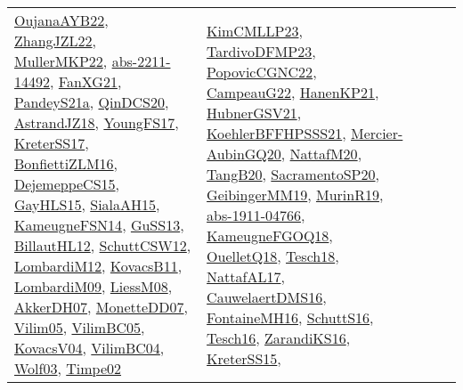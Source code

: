 {\begin{longtable}{llp{6cm}p{6cm}p{6cm}}
\href{papers/OujanaAYB22.pdf}{OujanaAYB22}\cite{OujanaAYB22}, \href{papers/ZhangJZL22.pdf}{ZhangJZL22}\cite{ZhangJZL22}, \href{articles/MullerMKP22.pdf}{MullerMKP22}\cite{MullerMKP22}, \href{articles/abs-2211-14492.pdf}{abs-2211-14492}\cite{abs-2211-14492}, \href{articles/FanXG21.pdf}{FanXG21}\cite{FanXG21}, \href{articles/PandeyS21a.pdf}{PandeyS21a}\cite{PandeyS21a}, \href{articles/QinDCS20.pdf}{QinDCS20}\cite{QinDCS20}, \href{papers/AstrandJZ18.pdf}{AstrandJZ18}\cite{AstrandJZ18}, \href{papers/YoungFS17.pdf}{YoungFS17}\cite{YoungFS17}, \href{articles/KreterSS17.pdf}{KreterSS17}\cite{KreterSS17}, \href{papers/BonfiettiZLM16.pdf}{BonfiettiZLM16}\cite{BonfiettiZLM16}, \href{papers/DejemeppeCS15.pdf}{DejemeppeCS15}\cite{DejemeppeCS15}, \href{papers/GayHLS15.pdf}{GayHLS15}\cite{GayHLS15}, \href{papers/SialaAH15.pdf}{SialaAH15}\cite{SialaAH15}, \href{articles/KameugneFSN14.pdf}{KameugneFSN14}\cite{KameugneFSN14}, \href{papers/GuSS13.pdf}{GuSS13}\cite{GuSS13}, \href{papers/BillautHL12.pdf}{BillautHL12}\cite{BillautHL12}, \href{papers/SchuttCSW12.pdf}{SchuttCSW12}\cite{SchuttCSW12}, \href{articles/LombardiM12.pdf}{LombardiM12}\cite{LombardiM12}, \href{articles/KovacsB11.pdf}{KovacsB11}\cite{KovacsB11}, \href{papers/LombardiM09.pdf}{LombardiM09}\cite{LombardiM09}, \href{articles/LiessM08.pdf}{LiessM08}\cite{LiessM08}, \href{papers/AkkerDH07.pdf}{AkkerDH07}\cite{AkkerDH07}, \href{papers/MonetteDD07.pdf}{MonetteDD07}\cite{MonetteDD07}, \href{papers/Vilim05.pdf}{Vilim05}\cite{Vilim05}, \href{articles/VilimBC05.pdf}{VilimBC05}\cite{VilimBC05}, \href{papers/KovacsV04.pdf}{KovacsV04}\cite{KovacsV04}, \href{papers/VilimBC04.pdf}{VilimBC04}\cite{VilimBC04}, \href{papers/Wolf03.pdf}{Wolf03}\cite{Wolf03}, \href{articles/Timpe02.pdf}{Timpe02}\cite{Timpe02} & \href{papers/KimCMLLP23.pdf}{KimCMLLP23}\cite{KimCMLLP23}, \href{papers/TardivoDFMP23.pdf}{TardivoDFMP23}\cite{TardivoDFMP23}, \href{papers/PopovicCGNC22.pdf}{PopovicCGNC22}\cite{PopovicCGNC22}, \href{articles/CampeauG22.pdf}{CampeauG22}\cite{CampeauG22}, \href{papers/HanenKP21.pdf}{HanenKP21}\cite{HanenKP21}, \href{articles/HubnerGSV21.pdf}{HubnerGSV21}\cite{HubnerGSV21}, \href{articles/KoehlerBFFHPSSS21.pdf}{KoehlerBFFHPSSS21}\cite{KoehlerBFFHPSSS21}, \href{papers/Mercier-AubinGQ20.pdf}{Mercier-AubinGQ20}\cite{Mercier-AubinGQ20}, \href{papers/NattafM20.pdf}{NattafM20}\cite{NattafM20}, \href{papers/TangB20.pdf}{TangB20}\cite{TangB20}, \href{articles/SacramentoSP20.pdf}{SacramentoSP20}\cite{SacramentoSP20}, \href{papers/GeibingerMM19.pdf}{GeibingerMM19}\cite{GeibingerMM19}, \href{papers/MurinR19.pdf}{MurinR19}\cite{MurinR19}, \href{articles/abs-1911-04766.pdf}{abs-1911-04766}\cite{abs-1911-04766}, \href{papers/KameugneFGOQ18.pdf}{KameugneFGOQ18}\cite{KameugneFGOQ18}, \href{papers/OuelletQ18.pdf}{OuelletQ18}\cite{OuelletQ18}, \href{papers/Tesch18.pdf}{Tesch18}\cite{Tesch18}, \href{articles/NattafAL17.pdf}{NattafAL17}\cite{NattafAL17}, \href{papers/CauwelaertDMS16.pdf}{CauwelaertDMS16}\cite{CauwelaertDMS16}, \href{papers/FontaineMH16.pdf}{FontaineMH16}\cite{FontaineMH16}, \href{papers/SchuttS16.pdf}{SchuttS16}\cite{SchuttS16}, \href{papers/Tesch16.pdf}{Tesch16}\cite{Tesch16}, \href{articles/ZarandiKS16.pdf}{ZarandiKS16}\cite{ZarandiKS16}, \href{papers/KreterSS15.pdf}{KreterSS15}\cite{KreterSS15}, 
\end{longtable}}
